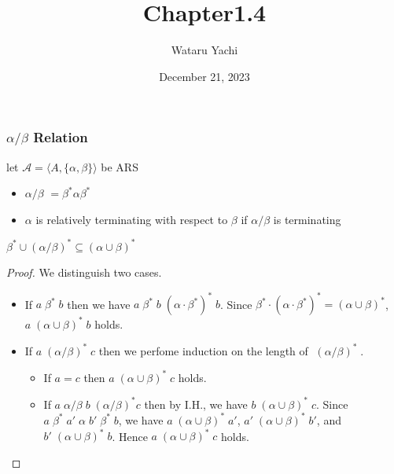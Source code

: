 \documentclass[12pt,aspectratio=169]{beamer}
\title{ Chapter1.4 }
\author{Wataru Yachi}
\institute{JAIST}
\date{December 21, 2023}
\begin{document}
\maketitle

\newcommand{\MA}{\mathcal{A}}
\newcommand{\AB}{\alpha/\beta}

\begin{frame}
    \frametitle{$\alpha/\beta$ Relation}
    \begin{definition}
        let $\MA = \langle A, \{\alpha,\beta\} \rangle$ be ARS
        \begin{itemize}
            \item \alert{$\AB$} $= \beta^*\alpha\beta^*$
            \item $\alpha$ is \alert{relatively terminating} with respect to $\beta$ if $\AB$ is terminating 
        \end{itemize}
    \end{definition}
    \begin{example}
    \end{example}
\end{frame}

\newcommand{\bcab}{\;\beta^* \cup (\alpha/\beta)^*\;}
\newcommand{\bs}{\;\beta^*\;}
\newcommand{\acbs}{\;(\alpha \cup \beta)^* \;}
\newcommand{\asbs}{\;(\alpha/\beta)^*\;}


\begin{frame}
    \begin{lemma}
        $\beta^* \cup (\alpha/\beta)^* \subseteq (\alpha \cup \beta)^*$
    \end{lemma}
    \begin{proof}
        We distinguish two cases.
        \begin{itemize}
            \item If $a \bs b$ then we have $a\;\beta^* \;b\; (\alpha \cdot \beta^*)^*\;b$.
            Since $\beta^* \cdot (\alpha \cdot \beta^*)^* = (\alpha \cup \beta)^*$, $a \acbs b$ holds.
            \item If $a \asbs c$ then we perfome induction on the length of $\asbs$.
                \begin{itemize}
                    \item If $a = c$ then $a \acbs c$ holds.
                    \item If $a \;\alpha/\beta\; b \; (\alpha/\beta)^* c$ then by I.H., we have $b \acbs c$.
                    Since $a \bs a' \; \alpha \; b' \bs b$, we have $a \acbs a'$, $a' \acbs b'$, and $b' \acbs b$.
                    Hence $a \acbs c$ holds.
                \end{itemize}
        \end{itemize}
    \end{proof}
\end{frame}
\end{document}
